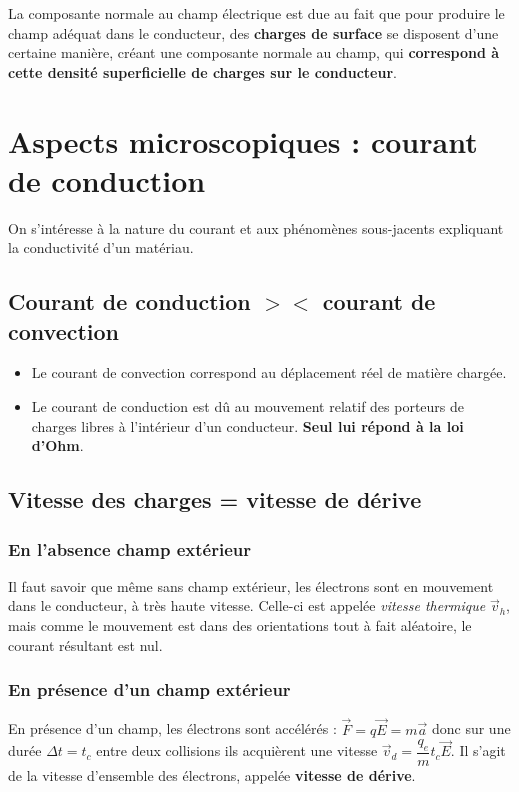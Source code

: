 \documentclass[12pt]{book}
\begin{document}
La composante normale au champ électrique est due au fait que pour produire le champ adéquat dans le conducteur, des \textbf{charges de surface} se disposent d'une certaine manière, créant une composante normale au champ, qui \textbf{correspond à cette densité superficielle de charges sur le conducteur}.
\section{Aspects microscopiques : courant de conduction}
On s'intéresse à la nature du courant et aux phénomènes sous-jacents expliquant la conductivité d'un matériau.
\subsection{Courant de conduction $><$ courant de convection}
\begin{itemize}
\item Le courant de convection correspond au déplacement réel de matière chargée.
\item Le courant de conduction est dû au mouvement relatif des porteurs de charges libres à l'intérieur d'un conducteur. \textbf{Seul lui répond à la loi d'Ohm}.
\end{itemize}
\subsection{Vitesse des charges = vitesse de dérive}
\subsubsection{En l'absence champ extérieur}
Il faut savoir que même sans champ extérieur, les électrons sont en mouvement dans le conducteur, à très haute vitesse. Celle-ci est appelée \textit{vitesse thermique} $\vec{v}_h$, mais comme le mouvement est dans des orientations tout à fait aléatoire, le courant  résultant est nul.
\subsubsection{En présence d'un champ extérieur}
En présence d'un champ, les électrons sont accélérés : $\vec{F} = q\vec{E} = m\vec{a}$ donc sur une durée $\Delta t = t_c$ entre deux collisions ils acquièrent une vitesse $\vec{v}_d = \dfrac{q_e}{m} t_c \vec{E}$. Il s'agit de la vitesse d'ensemble des électrons, appelée \textbf{vitesse de dérive}.
\end{document}
